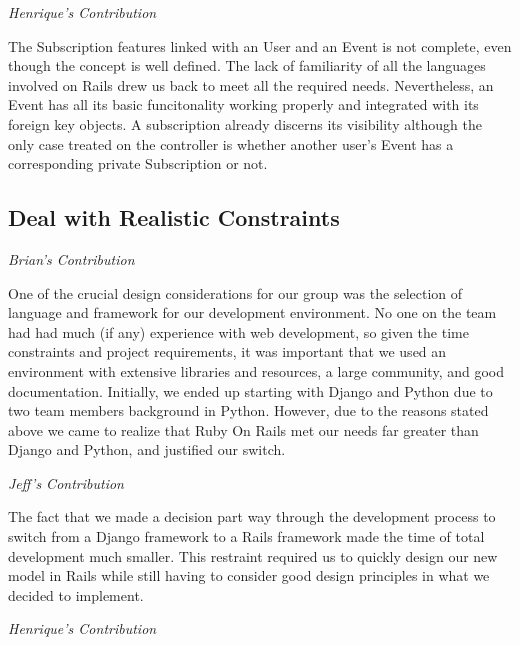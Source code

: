\documentclass[11pt]{article}
\begin{document}
\textit{Henrique's Contribution}

The Subscription features linked with an User and an Event is not complete, even though the concept is well defined. The lack of familiarity of all the languages involved on Rails drew us back to meet all the required needs. Nevertheless, an Event has all its basic funcitonality working properly and integrated with its foreign key objects. A subscription already discerns its visibility although the only case treated on the controller is whether another user's Event has a corresponding private Subscription or not. 

\subsection{Deal with Realistic Constraints}

\textit{Brian's Contribution}

One of the crucial design considerations for our group was the selection of language and framework for our development environment. No one on the team had had much (if any) experience with web development, so given the time constraints and project requirements, it was important that we used an environment with extensive libraries and resources, a large community, and good documentation. Initially, we ended up starting with Django and Python due to two team members background in Python. However, due to the reasons stated above we came to realize that Ruby On Rails met our needs far greater than Django and Python, and justified our switch. 

\textit{Jeff's Contribution}

The fact that we made a decision part way through the development process to switch from a Django framework to a Rails framework made the time of total development much smaller.  This restraint required us to quickly design our new model in Rails while still having to consider good design principles in what we decided to implement.

\textit{Henrique's Contribution}
\end{document}
